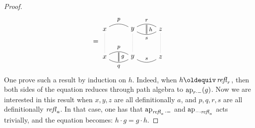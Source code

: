 \begin{proof}
\begin{displaymath}
    =%
    \begin{tikzpicture}[node distance=4em, baseline=(basenode.base)]
      \node[] (x1) {$x$};
      \node[right of=x1] (y1) {$y$};
      \node[right of=y1] (z1) {$z$};
      \node[below of=x1] (x2) {$x$};
      \node[right of=x2] (y2) {$y$};
      \node[right of=y2] (z2) {$z$};
      \draw[bend left] (x2) to node[above] (p) {\footnotesize$p$} (y2);
      \draw[bend right] (x2) to  node[below] (q1) {\footnotesize$q$} (y2);
      \draw[bend right] (y2) to node[above] (r1) {\footnotesize$s$} (z2);
      \draw[bend left] (y1) to node[above] (r2) {\footnotesize$r$} (z1);
      \draw[bend right] (y1) to  node[below] (s) {\footnotesize$s$} (z1);
      \draw[bend left] (x1) to node[above] (p2) {\footnotesize$p$} (y1);
      \draw[double, shorten >=.1em, shorten <=.1em] (p) to node[right] {\footnotesize$g$} (q1);
      \draw[double, shorten >=.1em, shorten <=.1em] (r2) to node[right] {\footnotesize$h$} (s);
      \draw[gray,densely dotted] (x1) to node (basenode){} (x2) (y1) to (y2) (z1) to (z2);
    \end{tikzpicture}%
  \end{displaymath}
  One prove such a result by induction on $h$. Indeed, when
  $h\jdeq \refl r$, then both sides of the equation reduces through
  path algebra to $\mathop{\mathrm{ap}_{r\cdot{-}}} (g)$. Now we are interested in
  this result when $x,y,z$ are all definitionally $a$, and $p,q,r,s$
  are all definitionally $\mathop{\mathit{refl}_{a}}$. In that case, one has that
  $\mathop{\mathrm{ap}_{\mathop{\mathit{refl}_{a}}\cdot {-}}}$ and $\mathop{\mathrm{ap}_{{-}\cdot\mathop{\mathit{refl}_{a}}}}$ acts
  trivially, and the equation becomes: $h\cdot g = g \cdot h$.


\end{proof}
